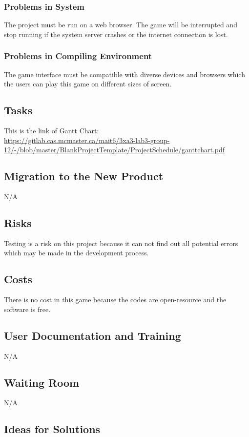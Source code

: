 \documentclass[12pt, titlepage]{article}
\begin{document}
\subsubsection{Problems in System}
The project must be run on a web browser. The game will be interrupted and stop running if the system server crashes or the internet connection is lost. 
\subsubsection{Problems in Compiling Environment}
The game interface must be compatible with diverse devices and browsers which the users can play this game on different sizes of screen. 

\subsection{Tasks}
This is the link of Gantt Chart:\\
\url{https://gitlab.cas.mcmaster.ca/mait6/3xa3-lab3-group-12/-/blob/master/BlankProjectTemplate/ProjectSchedule/ganttchart.pdf}

\subsection{Migration to the New Product}

N/A

\subsection{Risks}
Testing is a risk on this project because it can not find out all potential errors which may be made in the development process. 


\subsection{Costs}
There is no cost in this game because the codes are open-resource and the software is free.

\subsection{User Documentation and Training}
N/A
\subsection{Waiting Room}
N/A
\subsection{Ideas for Solutions}
\end{document}

